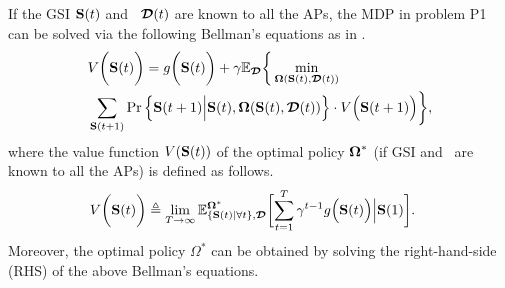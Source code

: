 If the GSI $\mathbf{S}(t)$ and \brlatency~$\boldsymbol{\mathcal{D}}(t)$ are known to all the APs, the MDP in problem P1 can be solved via the following Bellman's equations as in \cite{sutton1998}.
\begin{align}
    &V\bigg(\mathbf{S}(t)\bigg) =g\bigg(\mathbf{S}(t)\bigg)
        + \gamma\mathbb{E}_{\boldsymbol{\mathcal{D}}}\bigg\{
            \min_{\boldsymbol{\Omega}(\mathbf{S}(t),\boldsymbol{\mathcal{D}}(t))}
            \nonumber\\
            &\sum_{\mathbf{S}(t+1)} \Pr \Big\{ 
                \mathbf{S}(t+1) \Big| \mathbf{S}(t), \boldsymbol{\Omega}(\mathbf{S}(t), \boldsymbol{\mathcal{D}}(t)) \Big\} \cdot V\Big(\mathbf{S}(t+1)\Big)
            \bigg\},
    \label{eqn:sp_0}
\end{align}
where the value function $V(\mathbf{S}(t))$ of the optimal policy $\boldsymbol{\Omega}^{*}$ (if GSI and \brlatency~are known to all the APs) is defined as follows.
\begin{align}
    &V\Paren{\Stat(t)} \define
    \lim_{T\to\infty} 
    \mathbb{E}^{\Policy^*}_{\set{\Stat(t)|\forall t}, \Delay} \Bracket{
        \sum_{t=1}^{T} \gamma^{t-1} g\Big( \Stat(t) \Big) \Big| \Stat(1)
    }.
    \label{eqn:val_f}
\end{align}
Moreover, the optimal policy $\Omega^{*}$ can be obtained by solving the right-hand-side (RHS) of the above Bellman's equations.

